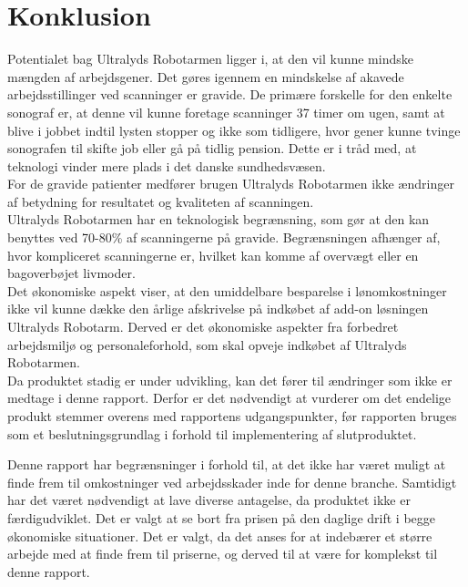 \chapter{Konklusion}
Potentialet bag Ultralyds Robotarmen ligger i, at den vil kunne mindske mængden af arbejdsgener. Det gøres igennem en mindskelse af akavede arbejdsstillinger ved scanninger er gravide.
De primære forskelle for den enkelte sonograf er, at denne vil kunne foretage scanninger 37 timer om ugen, samt at blive i jobbet indtil lysten stopper og ikke som tidligere, hvor gener kunne tvinge sonografen til skifte job eller gå på tidlig pension. Dette er i tråd med, at teknologi vinder mere plads i det danske sundhedsvæsen.\\
For de gravide patienter medfører brugen Ultralyds Robotarmen ikke ændringer af betydning for resultatet og kvaliteten af scanningen. \\
Ultralyds Robotarmen har en teknologisk begrænsning, som gør at den kan benyttes ved 70-80\% af scanningerne på gravide. Begrænsningen afhænger af, hvor kompliceret scanningerne er, hvilket kan komme af overvægt eller en bagoverbøjet livmoder. \\
Det økonomiske aspekt viser, at den umiddelbare besparelse i lønomkostninger ikke vil kunne dække den årlige afskrivelse på indkøbet af add-on løsningen Ultralyds Robotarm. Derved er det økonomiske aspekter fra forbedret arbejdsmiljø og personaleforhold, som skal opveje indkøbet af Ultralyds Robotarmen.\\  
Da produktet stadig er under udvikling, kan det fører til ændringer som ikke er medtage i denne rapport. Derfor er det nødvendigt at vurderer om det endelige produkt stemmer overens med rapportens udgangspunkter, før rapporten bruges som et beslutningsgrundlag i forhold til implementering af slutproduktet.

Denne rapport har begrænsninger i forhold til, at det ikke har været muligt at finde frem til omkostninger ved arbejdsskader inde for denne branche. 
Samtidigt har det været nødvendigt at lave diverse antagelse, da produktet ikke er færdigudviklet. Det er valgt at se bort fra prisen på den daglige drift i begge økonomiske situationer. Det er valgt, da det anses for at indebærer et større arbejde med at finde frem til priserne, og derved til at være for komplekst til denne rapport.   
